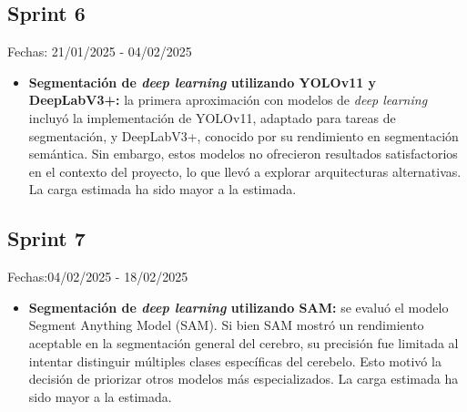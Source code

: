 \subsection{Sprint 6}
Fechas: 21/01/2025 - 04/02/2025
\begin{itemize}
    \item \textbf{Segmentación de \textit{deep learning} utilizando YOLOv11 y DeepLabV3+:} la primera aproximación con modelos de \textit{deep learning} incluyó la implementación de YOLOv11, adaptado para tareas de segmentación, y DeepLabV3+, conocido por su rendimiento en segmentación semántica. Sin embargo, estos modelos no ofrecieron resultados satisfactorios en el contexto del proyecto, lo que llevó a explorar arquitecturas alternativas. La carga estimada ha sido mayor a la estimada.
\end{itemize}

\subsection{Sprint 7}
Fechas:04/02/2025 - 18/02/2025
\begin{itemize}
    \item \textbf{Segmentación de \textit{deep learning} utilizando SAM:} se evaluó el modelo Segment Anything Model (SAM). Si bien SAM mostró un rendimiento aceptable en la segmentación general del cerebro, su precisión fue limitada al intentar distinguir múltiples clases específicas del cerebelo. Esto motivó la decisión de priorizar otros modelos más especializados. La carga estimada ha sido mayor a la estimada.
\end{itemize}

